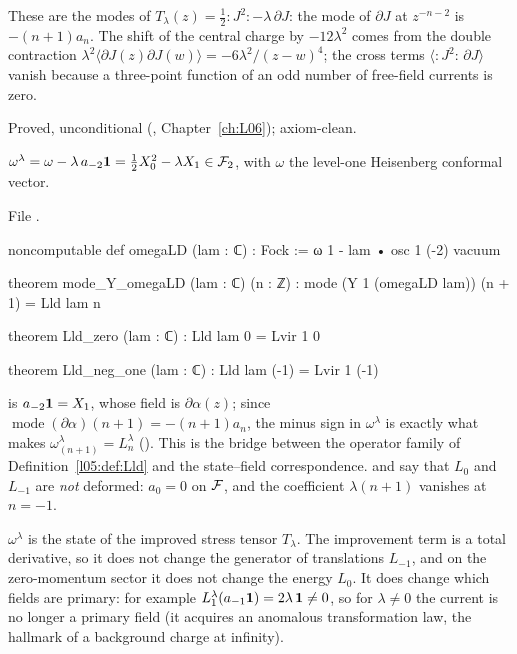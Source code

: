 \begin{physics}
These are the modes of $T_\lambda(z)=\frac12{:}J^2{:}-\lambda\,\partial J$: the mode of $\partial J$ at
$z^{-n-2}$ is $-(n+1)a_n$. The shift of the central charge by $-12\lambda^2$ comes from the double
contraction $\lambda^2\langle\partial J(z)\partial J(w)\rangle=-6\lambda^2/(z-w)^4$; the cross terms
$\langle{:}J^2{:}\,\partial J\rangle$ vanish because a three-point function of an odd number of
free-field currents is zero.
\end{physics}

\begin{status}
Proved, unconditional (, Chapter~\ref{ch:L06}); axiom-clean.
\end{status}

\begin{definition}\label{l05:def:omegaLD}
$\omega^\lambda=\omega-\lambda\,a_{-2}\mathbf{1}=\frac12X_0^2-\lambda X_1\in\mathcal{F}_2$, with $\omega$ the
level-one Heisenberg conformal vector.
\end{definition}

\noindent File .
\begin{leancode}
noncomputable def omegaLD (lam : ℂ) : Fock := ω 1 - lam • osc 1 (-2) vacuum

theorem mode_Y_omegaLD (lam : ℂ) (n : ℤ) :
    mode (Y 1 (omegaLD lam)) (n + 1) = Lld lam n

theorem Lld_zero (lam : ℂ) : Lld lam 0 = Lvir 1 0

theorem Lld_neg_one (lam : ℂ) : Lld lam (-1) = Lvir 1 (-1)
\end{leancode}

\begin{dictionary}
 is $a_{-2}\mathbf{1}=X_1$, whose field is $\partial\alpha(z)$; since
$\operatorname{mode}(\partial\alpha)(n+1)=-(n+1)a_n$, the minus sign in $\omega^\lambda$ is exactly what makes
$\omega^\lambda_{(n+1)}=L^\lambda_n$ (). This is the bridge between the operator family of
Definition~\ref{l05:def:Lld} and the state--field correspondence.  and  say
that $L_0$ and $L_{-1}$ are \emph{not} deformed: $a_0=0$ on $\mathcal{F}$, and the coefficient $\lambda(n+1)$
vanishes at $n=-1$.
\end{dictionary}

\begin{physics}
$\omega^\lambda$ is the state of the improved stress tensor $T_\lambda$. The improvement term is a total
derivative, so it does not change the generator of translations $L_{-1}$, and on the zero-momentum sector
it does not change the energy $L_0$. It does change which fields are primary: for example
$L^\lambda_1(a_{-1}\mathbf{1})=2\lambda\,\mathbf{1}\neq0$, so for $\lambda\ne0$ the current is no longer a primary
field (it acquires an anomalous transformation law, the hallmark of a background charge at infinity).
\end{physics}

